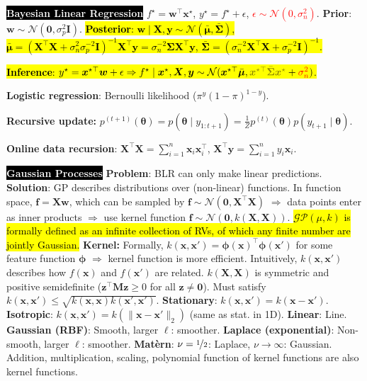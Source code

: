 \documentclass{article}
\DeclareRobustCommand{\hlal}[1]{{\textcolor{red}{#1}}}
\DeclareRobustCommand{\hlep}[1]{{\textcolor{olive}{#1}}}
\newenvironment{topic}[1]
{\textbf{\sffamily  \colorbox{black}{\textcolor{white}{#1}}}}
{}
\begin{document}
\begin{multicols*}{3}
  \begin{topic}{Bayesian Linear Regression}
    $f^\star = \bm{w}^\top \bm{x}^\star$, $y^\star = f^\star + \epsilon$,
    \hlal{$\epsilon \sim \mathcal{N}(0, \sigma_n^2)$}. \textbf{Prior}: $\bm{w}
    \sim \mathcal{N}(\bm{0}, \sigma_p^2\bm{I})$. \hl{\textbf{Posterior}:
    $\bm{w}\mid \bm{X},\bm{y} \sim
    \mathcal{N}(\bar{\bm{\mu}},\bar{\bm{\Sigma}})$, $\bar{\bm{\mu}} =
    (\bm{X}^\top\bm{X} + \sigma_n^2 \sigma_p^{-2} \bm{I})^{-1} \bm{X}^\top
    \bm{y} = \sigma_n^{-2} \bm{\Sigma}\bm{X}^\top\bm{y}$, $\bar{\bm{\Sigma}} =
    (\sigma_n^{-2} \bm{X}^\top \bm{X} + \sigma_p^{-2}\bm{I})^{-1}$.}

    \hl{\textbf{Inference}: $y^\star = \bm{x}^{\star\top}\bm{w} + \epsilon
    \Rightarrow f^\star \mid \bm{x}^\star,\bm{X},\bm{y} \sim
    \mathcal{N}(\bm{x}^{\star\top} \bar{\bm{\mu}}, \text{\hlep{$\bm{x}^{\star\top}
    \bar{\bm{\Sigma}}\bm{x}^\star$}} + \text{\hlal{$\sigma_n^2$}})$.}

    \textbf{Logistic regression}: Bernoulli likelihood ($\pi^y(1-\pi)^{1-y}$).

    \textbf{Recursive update:} $p^{(t+1)}(\bm{\theta}) = p(\bm{\theta}\mid
    y_{1:{t+1}}) = \frac{1}{Z} p^{(t)}(\bm{\theta}) p(y_{t+1}\mid
    \bm{\theta})$.

    \textbf{Online data recursion}: $\bm{X}^\top\bm{X} = \sum_{i=1}^n \bm{x}_i
    \bm{x}_i^\top$, $\bm{X}^\top\bm{y} = \sum_{i=1}^n y_i\bm{x}_i$.
  \end{topic}

  \begin{topic}{Gaussian Processes}
    \textbf{Problem}: BLR can only make linear predictions. \textbf{Solution}:
    GP describes distributions over (non-linear) functions. In function space,
    $\bm{f}=\bm{X}\bm{w}$, which can be sampled by $\bm{f} \sim
    \mathcal{N}(\bm{0}, \bm{X}^\top\bm{X})$ $\Rightarrow$ data points enter as
    inner products $\Rightarrow$ use kernel function $\bm{f} \sim
    \mathcal{N}(\bm{0},k(\bm{X},\bm{X}))$. \hl{$\mathcal{GP}(\mu,k)$ is
    formally defined as an infinite collection of RVs, of which any finite
    number are jointly Gaussian.} \textbf{Kernel:} Formally, $k(\bm{x},\bm{x}')
    = \bm{\phi}(\bm{x})^\top\bm{\phi}(\bm{x}')$ for some feature function
    $\bm{\phi}$ $\Rightarrow$ kernel function is more efficient.
    Intuitively, $k(\bm{x},\bm{x}')$ describes how $f(\bm{x})$ and
    $f(\bm{x}')$ are related. $k(\bm{X},\bm{X})$ is symmetric and positive
    semidefinite ($\bm{z}^\top \bm{M} \bm{z} \geq 0$ for all $\bm{z} \neq
    \bm{0}$). Must satisfy $k(\bm{x},\bm{x}') \leq
    \sqrt{k(\bm{x},\bm{x})k(\bm{x}',\bm{x}')}$. \textbf{Stationary}:
    $k(\bm{x},\bm{x}')=k(\bm{x}-\bm{x}')$. \textbf{Isotropic}:
    $k(\bm{x},\bm{x}')=k(\|\bm{x}-\bm{x}'\|_2)$ (same as stat. in 1D).
    \textbf{Linear}: Line. \textbf{Gaussian (RBF)}: Smooth, larger $\ell$: smoother.
    \textbf{Laplace (exponential)}: Non-smooth, larger $\ell$: smoother.
    \textbf{Mat\`ern}: $\nu=\nicefrac{1}{2}$: Laplace, $\nu\to\infty$:
    Gaussian. Addition, multiplication, scaling, polynomial function of kernel
    functions are also kernel functions.


\end{topic}
\end{multicols*}
\end{document}
